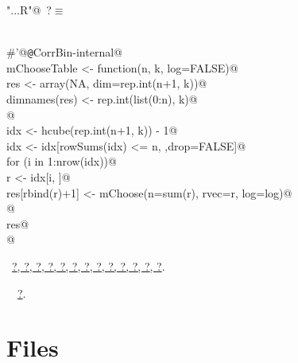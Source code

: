 \documentclass[reqno]{amsart}
\renewcommand{\NWtarget}[2]{\hypertarget{#1}{#2}}
\renewcommand{\NWlink}[2]{\hyperlink{#1}{#2}}
\begin{document}
\begin{flushleft} \small
\begin{minipage}{\linewidth}\label{scrap47}\raggedright\small
\NWtarget{nuweb?}{} \verb@"..\R\ExchMultinomial.R"@\nobreak\ {\footnotesize {?}}$\equiv$
\vspace{-1ex}
\begin{list}{}{} \item
\mbox{}\verb@@\\
\mbox{}\verb@#'@{\tt @}\verb@rdname CorrBin-internal@\\
\mbox{}\verb@  mChooseTable <- function(n, k, log=FALSE){@\\
\mbox{}\verb@    res <- array(NA, dim=rep.int(n+1, k))@\\
\mbox{}\verb@    dimnames(res) <- rep.int(list(0:n), k)@\\
\mbox{}\verb@    @\\
\mbox{}\verb@    idx <- hcube(rep.int(n+1, k)) - 1@\\
\mbox{}\verb@    idx <- idx[rowSums(idx) <= n, ,drop=FALSE]@\\
\mbox{}\verb@    for (i in 1:nrow(idx)){@\\
\mbox{}\verb@        r <- idx[i, ]@\\
\mbox{}\verb@        res[rbind(r)+1] <- mChoose(n=sum(r), rvec=r, log=log)@\\
\mbox{}\verb@    }@\\
\mbox{}\verb@    res@\\
\mbox{}\verb@  }@\\
\mbox{}\verb@@{\NWsep}
\end{list}
\vspace{-1.5ex}
\footnotesize
\begin{list}{}{\setlength{\itemsep}{-\parsep}\setlength{\itemindent}{-\leftmargin}}
\item \NWtxtFileDefBy\ \NWlink{nuweb?}{?}\NWlink{nuweb?}{, ?}\NWlink{nuweb?}{, ?}\NWlink{nuweb?}{, ?}\NWlink{nuweb?}{, ?}\NWlink{nuweb?}{, ?}\NWlink{nuweb?}{, ?}\NWlink{nuweb?}{, ?}\NWlink{nuweb?}{, ?}\NWlink{nuweb?}{, ?}\NWlink{nuweb?}{, ?}\NWlink{nuweb?}{, ?}\NWlink{nuweb?}{, ?}.
\item \NWtxtIdentsUsed\nobreak\  \verb@mChoose@\nobreak\ \NWlink{nuweb?}{?}.
\item{}
\end{list}
\end{minipage}\vspace{4ex}
\end{flushleft}
\section{Files}
\end{document}
